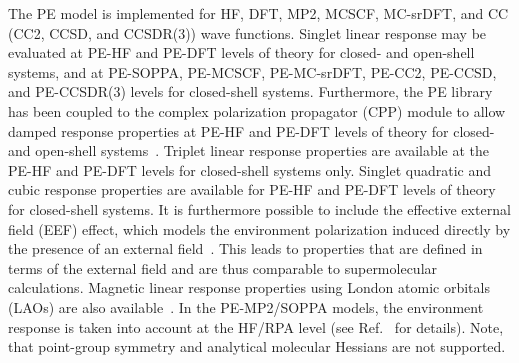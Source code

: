The PE model is implemented for HF, DFT, MP2, MCSCF, MC-srDFT, and
CC (CC2, CCSD, and CCSDR(3)) wave functions. Singlet linear response may be evaluated
at PE-HF and PE-DFT levels of theory for closed- and open-shell systems,
and at PE-SOPPA, PE-MCSCF, PE-MC-srDFT, PE-CC2, PE-CCSD, and PE-CCSDR(3) levels for
closed-shell systems.
Furthermore, the PE library has been coupled to the complex polarization
propagator (CPP) module to allow damped response properties at
PE-HF and PE-DFT levels of theory for closed- and open-shell systems~\cite{pecpp}.
Triplet linear response properties are
available at the PE-HF and PE-DFT levels for closed-shell systems
only.
Singlet quadratic and cubic response properties are available for PE-HF and PE-DFT
levels of theory for closed-shell systems.
It is furthermore possible to include the effective external field (EEF) effect,
which models the environment polarization induced directly by the presence of an
external field~\cite{peeef,peeef2}.
This leads to properties that are defined in terms of the external field and are
thus comparable to supermolecular calculations.
Magnetic linear response properties using London atomic orbitals (LAOs) are also
available~\cite{pelao}.
In the PE-MP2/SOPPA models, the environment response is taken into account at the
HF/RPA level (see Ref.~\cite{pesoppa} for details).
Note, that point-group symmetry and analytical molecular Hessians are not supported.


